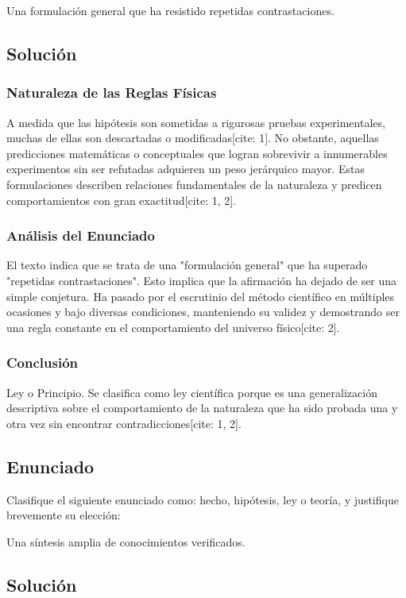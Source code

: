 \documentclass[12pt, a4paper]{article}
\begin{document}
Una formulación general que ha resistido repetidas contrastaciones.

\subsection*{Solución}

\subsubsection*{Naturaleza de las Reglas Físicas}
A medida que las hipótesis son sometidas a rigurosas pruebas experimentales, muchas de ellas son descartadas o modificadas[cite: 1]. No obstante, aquellas predicciones matemáticas o conceptuales que logran sobrevivir a innumerables experimentos sin ser refutadas adquieren un peso jerárquico mayor. Estas formulaciones describen relaciones fundamentales de la naturaleza y predicen comportamientos con gran exactitud[cite: 1, 2].

\subsubsection*{Análisis del Enunciado}
El texto indica que se trata de una "formulación general" que ha superado "repetidas contrastaciones". Esto implica que la afirmación ha dejado de ser una simple conjetura. Ha pasado por el escrutinio del método científico en múltiples ocasiones y bajo diversas condiciones, manteniendo su validez y demostrando ser una regla constante en el comportamiento del universo físico[cite: 2]. 

\subsubsection*{Conclusión}
Ley o Principio. Se clasifica como ley científica porque es una generalización descriptiva sobre el comportamiento de la naturaleza que ha sido probada una y otra vez sin encontrar contradicciones[cite: 1, 2].

\newpage

\subsection*{Enunciado}
Clasifique el siguiente enunciado como: hecho, hipótesis, ley o teoría, y justifique brevemente su elección: 

Una síntesis amplia de conocimientos verificados.

\subsection*{Solución}
\end{document}
